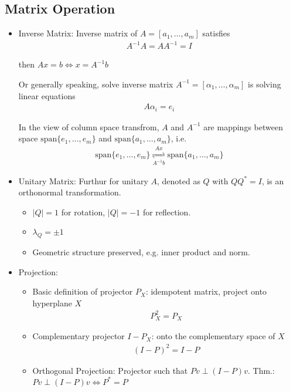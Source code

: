 \subsection{Matrix Operation}
\begin{itemize}[topsep=2pt,itemsep=0pt]
    \item Inverse Matrix: Inverse matrix of $ A=[a_1,\ldots,a_m] $ satisfies
    \begin{align}
        A^{-1}A=AA^{-1}=I 
    \end{align}

    then $ Ax=b\Leftrightarrow x= A^{-1}b$    

    Or generally speaking, solve inverse matrix $ A^{-1}=[\alpha_1,\ldots,\alpha _m] $ is solving linear equations 
    \begin{align}
        A\alpha _i=e_i
    \end{align}
    
    In the view of column space transfrom, $ A $ and $ A^{-1} $ are mappings between space $ \mathrm{span}\{e_1,\ldots,e_m\}  $ and $ \mathrm{span}\{a_1,\ldots,a_m\}  $, i.e.
    \begin{align}
        \mathrm{span}\{e_1,\ldots,e_m\} \mathop{\rightleftharpoons }\limits_{A^{-1}b}^{Ax}  \mathrm{span}\{a_1,\ldots,a_m\}
    \end{align}
    
    \item Unitary Matrix: Furthur for unitary $ A $, denoted as $ Q $ with $ QQ^*=I $, is an orthonormal transformation.
\begin{itemize}[topsep=2pt,itemsep=0pt]
    \item $ |Q|=1 $ for rotation, $ |Q|=-1 $ for reflection.
    \item $ \lambda_Q=\pm 1 $
    \item Geometric structure preserved, e.g. inner product and norm.
\end{itemize}

    \item Projection: 
    \begin{itemize}
        \item Basic definition of projector $ P_X $: idempotent matrix, project onto hyperplane $ X $ 
        \begin{align}
            P_X^2=P_X 
        \end{align}        
        \item Complementary projector $ I-P_X $: onto the complementary space of $ X $
        \begin{align}
             (I-P)^2=I-P
        \end{align}
        \item Orthogonal Projection: Projector such that $ Pv\perp (I-P)v $. Thm.: $ Pv\perp (I-P)v\Leftrightarrow P^*=P $
        

\end{itemize}
\end{itemize}
